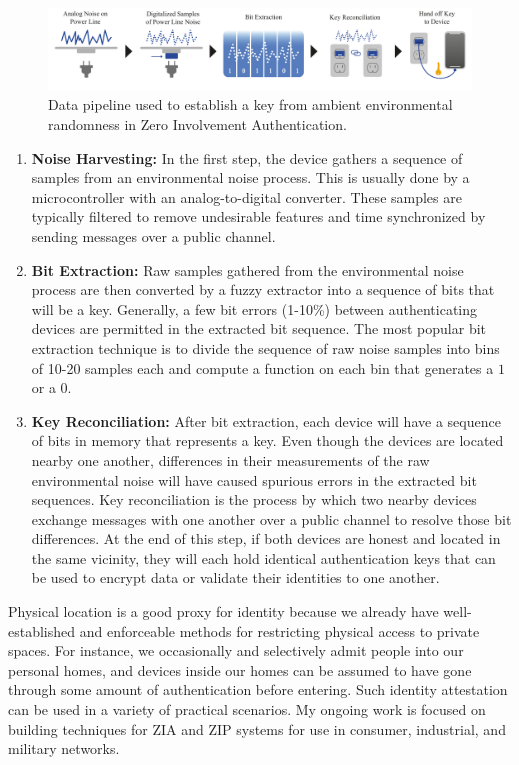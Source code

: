 \documentclass[10pt,onecolumn]{article}
\begin{document}
\begin{figure}
\includegraphics[width=\hsize]{figures/datapipeline.pdf}
\caption{Data pipeline used to establish a key from ambient environmental randomness in Zero Involvement Authentication.}
\label{fig:pipeline}
\end{figure}


\begin{enumerate}%
    \item \textbf{Noise Harvesting:} In the first step, the device gathers a sequence of samples from an environmental noise process.
    This is usually done by a microcontroller with an analog-to-digital converter.
    These samples are typically filtered to remove undesirable features and time synchronized by sending messages over a public channel.
    \item \textbf{Bit Extraction:} Raw samples gathered from the environmental noise process are then converted by a fuzzy extractor into a sequence of bits that will be a key.
    Generally, a few bit errors (1-10\%) between authenticating devices are permitted in the extracted bit sequence.
    The most popular bit extraction technique is to divide the sequence of raw noise samples into bins of 10-20 samples each and compute a function on each bin that generates a $1$ or a $0$.
    \item \textbf{Key Reconciliation:} After bit extraction, each device will have a sequence of bits in memory that represents a key.
    Even though the devices are located nearby one another, differences in their measurements of the raw environmental noise will have caused spurious errors in the extracted bit sequences.
    Key reconciliation is the process by which two nearby devices exchange messages with one another over a public channel to resolve those bit differences.
    At the end of this step, if both devices are honest and located in the same vicinity, they will each hold identical authentication keys that can be used to encrypt data or validate their identities to one another.
\end{enumerate}


Physical location is a good proxy for identity because we already have well-established and enforceable methods for restricting physical access to private spaces.
For instance, we occasionally and selectively admit people into our personal homes, and devices inside our homes can be assumed to have gone through some amount of authentication before entering.
Such identity attestation can be used in a variety of practical scenarios.
My ongoing work is focused on building techniques for ZIA and ZIP systems for use in consumer, industrial, and military networks.
\end{document}
